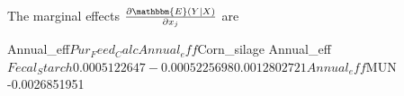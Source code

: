\documentclass[12pt,]{article}
\begin{document}
The marginal effects $\frac{\partial \mathbbm{E}(Y|X)}{\partial x_j}$ are
\begin{Schunk}
\begin{Soutput}
Annual_eff$Pur_Feed_Calc   Annual_eff$Corn_silage  Annual_eff$Fecal_Starch 
            0.0005122647            -0.0005225698             0.0012802721 
          Annual_eff$MUN 
           -0.0026851951 
\end{Soutput}
\end{Schunk}
\end{document}
